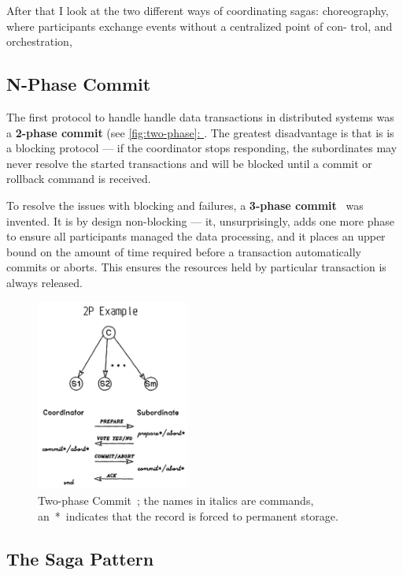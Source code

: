 \documentclass[thesis=M,english,hidelinks]{FITthesis}[2012/10/20]
\newcommand*{\fullref}[1]{\hyperref[{#1}]{\autoref*{#1}: \textit{\nameref*{#1}}}}
\begin{document}
After that I look at the two different ways of coordinating sagas: choreography, where participants exchange events without a centralized point of con- trol, and orchestration, 

\subsection{N-Phase Commit}

The first protocol to handle handle data transactions in distributed systems was a \textbf{2-phase commit} (see \fullref{fig:two-phase}. The greatest disadvantage is that is is a blocking protocol --- if the coordinator stops responding, the subordinates may never resolve the started transactions and will be blocked until a commit or rollback command is received.

To resolve the issues with blocking and failures, a \textbf{3-phase commit}~\cite{3-phase-commit} was invented. It is by design non-blocking --- it, unsurprisingly, adds one more phase to ensure all participants managed the data processing, and it places an upper bound on the amount of time required before a transaction automatically commits or aborts. This ensures the resources held by particular transaction is always released.

\begin{figure}
  \centering
    \includegraphics[width=0.45\textwidth]{images/2PC.png}
    \caption[Two-phase Commit]{Two-phase Commit~\cite{two-phase-commit}; the names in italics are commands, an~*~indicates that the record is forced to permanent storage.}
    \label{fig:two-phase}
\end{figure}

\subsection{The Saga Pattern}
\end{document}
